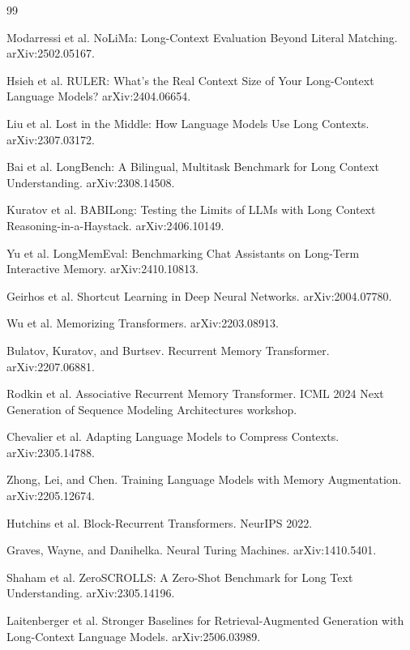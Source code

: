 \documentclass{article}
\begin{document}
\begin{thebibliography}{99}

Modarressi et al.
\newblock NoLiMa: Long-Context Evaluation Beyond Literal Matching.
\newblock arXiv:2502.05167.

Hsieh et al.
\newblock RULER: What's the Real Context Size of Your Long-Context Language Models?
\newblock arXiv:2404.06654.

Liu et al.
\newblock Lost in the Middle: How Language Models Use Long Contexts.
\newblock arXiv:2307.03172.

Bai et al.
\newblock LongBench: A Bilingual, Multitask Benchmark for Long Context Understanding.
\newblock arXiv:2308.14508.

Kuratov et al.
\newblock BABILong: Testing the Limits of LLMs with Long Context Reasoning-in-a-Haystack.
\newblock arXiv:2406.10149.

Yu et al.
\newblock LongMemEval: Benchmarking Chat Assistants on Long-Term Interactive Memory.
\newblock arXiv:2410.10813.

Geirhos et al.
\newblock Shortcut Learning in Deep Neural Networks.
\newblock arXiv:2004.07780.

Wu et al.
\newblock Memorizing Transformers.
\newblock arXiv:2203.08913.

Bulatov, Kuratov, and Burtsev.
\newblock Recurrent Memory Transformer.
\newblock arXiv:2207.06881.

Rodkin et al.
\newblock Associative Recurrent Memory Transformer.
\newblock ICML 2024 Next Generation of Sequence Modeling Architectures workshop.

Chevalier et al.
\newblock Adapting Language Models to Compress Contexts.
\newblock arXiv:2305.14788.

Zhong, Lei, and Chen.
\newblock Training Language Models with Memory Augmentation.
\newblock arXiv:2205.12674.

Hutchins et al.
\newblock Block-Recurrent Transformers.
\newblock NeurIPS 2022.

Graves, Wayne, and Danihelka.
\newblock Neural Turing Machines.
\newblock arXiv:1410.5401.

Shaham et al.
\newblock ZeroSCROLLS: A Zero-Shot Benchmark for Long Text Understanding.
\newblock arXiv:2305.14196.

Laitenberger et al.
\newblock Stronger Baselines for Retrieval-Augmented Generation with Long-Context Language Models.
\newblock arXiv:2506.03989.

\end{thebibliography}
\end{document}
